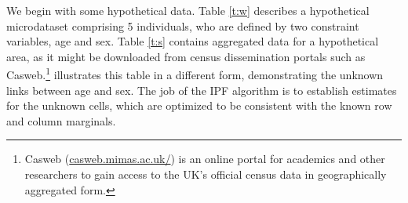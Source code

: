 \documentclass[a4paper,10pt]{article}
\begin{document}

We begin with some hypothetical data.
Table \ref{t:w}  describes a
hypothetical microdataset comprising 5 individuals, who are defined by two
constraint variables, age and sex. 
Table \ref{t:s} contains aggregated data
for a hypothetical area, as it might be downloaded from census dissemination
portals such as Casweb.\footnote{Casweb
    (\href{http://casweb.mimas.ac.uk/}{casweb.mimas.ac.uk/})
is an online portal for academics and other researchers to
gain access to the UK's official census data in geographically
aggregated form.}  illustrates this table in a different form,
demonstrating the unknown links between age and sex. The job of the IPF
algorithm is to establish estimates for the unknown cells, which are
optimized to be consistent with the known row and column marginals.
\end{document}
